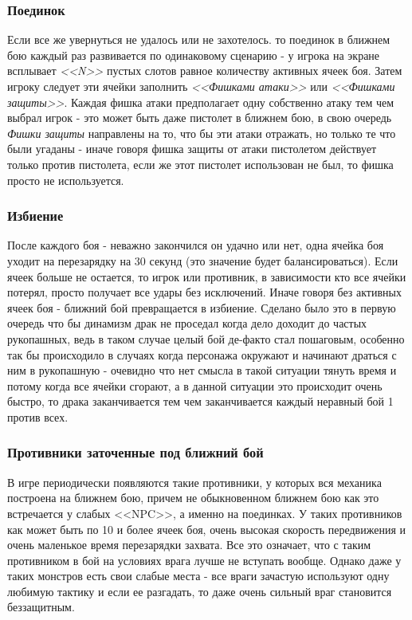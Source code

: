 \documentclass[11pt]{report}
\begin{document}
\subsubsection{Поединок}
Если все же увернуться не удалось или не захотелось. то поединок в ближнем бою каждый раз развивается по одинаковому сценарию - у игрока на экране всплывает \textit{<<N>>} пустых слотов равное количеству активных ячеек боя. Затем игроку следует эти ячейки заполнить \textit{<<Фишками атаки>>} или \textit{<<Фишками защиты>>}. Каждая фишка атаки предполагает одну собственно атаку тем чем выбрал игрок - это может быть даже пистолет в ближнем бою, в свою очередь \textit{Фишки защиты} направлены на то, что бы эти атаки отражать, но только те что были угаданы - иначе говоря фишка защиты от атаки пистолетом действует только против пистолета, если же этот пистолет использован не был, то фишка просто не используется.

\subsubsection{Избиение}
После каждого боя - неважно закончился он удачно или нет, одна ячейка боя уходит на перезарядку на 30 секунд (это значение будет балансироваться). Если ячеек больше не остается, то игрок или противник, в зависимости кто все ячейки потерял, просто получает все удары без исключений. Иначе говоря без активных ячеек боя - ближний бой превращается в избиение. Сделано было это в первую очередь что бы динамизм драк не проседал когда дело доходит до частых рукопашных, ведь в таком случае целый бой де-факто стал пошаговым, особенно так бы происходило в случаях когда персонажа окружают и начинают драться с ним в рукопашную - очевидно что нет смысла в такой ситуации тянуть время и потому когда все ячейки сгорают, а в данной ситуации это происходит очень быстро, то драка заканчивается тем чем заканчивается каждый неравный бой 1 против всех.


\subsubsection{Противники заточенные под ближний бой}
В игре периодически появляются такие противники, у которых вся механика построена на ближнем бою, причем не обыкновенном ближнем бою как это встречается у слабых <<NPC>>, а именно на поединках. У таких противников как может быть по 10 и более ячеек боя, очень высокая скорость передвижения и очень маленькое время перезарядки захвата. Все это означает, что с таким противником в бой на условиях врага лучше не вступать вообще. Однако даже у таких монстров есть свои слабые места - все враги зачастую используют одну любимую тактику и если ее разгадать, то даже очень сильный враг становится беззащитным. 
\end{document}
